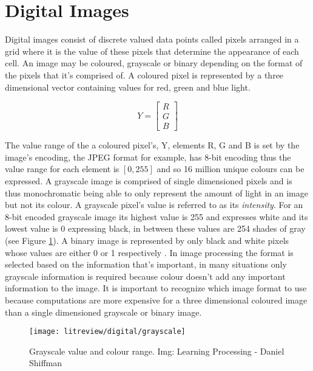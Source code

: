 \section{Digital Images}
\label{section:digital_image}
Digital images consist of discrete valued data points called pixels arranged in a grid where it is the value of these pixels that determine the appearance of each cell. An image may be coloured, grayscale or binary depending on the format of the pixels that it's comprised of. A coloured pixel is represented by a three dimensional vector containing values for red, green and blue light.

\begin{equation}
  Y = \begin{bmatrix}
    R \\ G \\ B
  \end{bmatrix}
\end{equation}

The value range of the a coloured pixel's, Y, elements R, G and B is set by the image's encoding, the JPEG format for example, has 8-bit encoding thus the value range for each element is $[0, 255]$ and so 16 million unique colours can be expressed. A grayscale image is comprised of single dimensioned pixels and is thus monochromatic being able to only represent the amount of light in an image but not its colour. A grayscale pixel's value is referred to as its \emph{intensity}. For an 8-bit encoded grayscale image its highest value is 255 and expresses white and its lowest value is 0 expressing black, in between these values are 254 shades of gray (see Figure \ref{fig:grayscale}). A binary image is represented by only black and white pixels whose values are either 0 or 1 respectively \cite{learnproc}. In image processing the format is selected based on the information that's important, in many situations only grayscale information is required because colour doesn't add any important information to the image. It is important to recognize which image format to use because computations are more expensive for a three dimensional coloured image than a single dimensioned grayscale or binary image. 

\begin{figure}[H]
  \centering
  \centering\texttt{[image: litreview/digital/grayscale]}
  \caption{Grayscale value and colour range. Img: Learning Processing - Daniel Shiffman}
  \label{fig:grayscale}
\end{figure}

